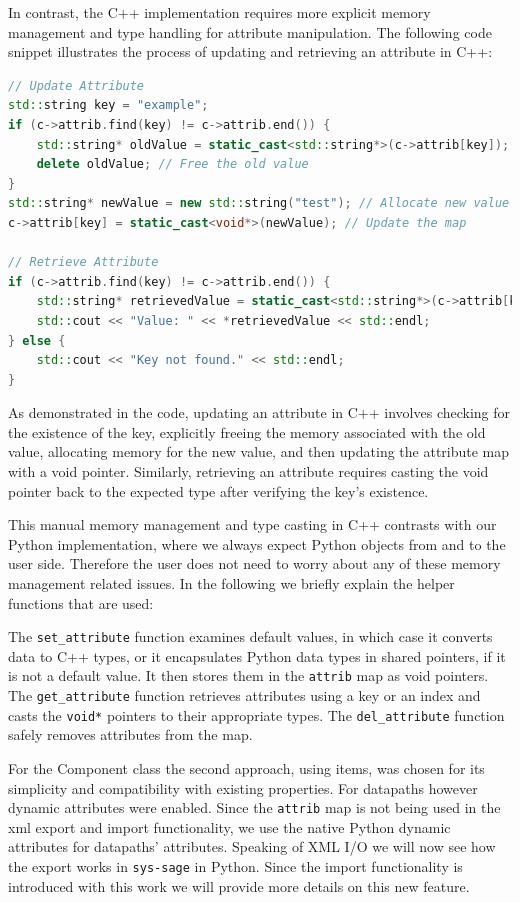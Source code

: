 In contrast, the C++ implementation requires more explicit memory management and type handling for attribute manipulation. The following code snippet illustrates the process of updating and retrieving an attribute in C++:

\begin{lstlisting}[language=C++, xleftmargin=4em, frame = single]
// Update Attribute
std::string key = "example";
if (c->attrib.find(key) != c->attrib.end()) {
    std::string* oldValue = static_cast<std::string*>(c->attrib[key]);
    delete oldValue; // Free the old value
}
std::string* newValue = new std::string("test"); // Allocate new value
c->attrib[key] = static_cast<void*>(newValue); // Update the map

// Retrieve Attribute
if (c->attrib.find(key) != c->attrib.end()) {
    std::string* retrievedValue = static_cast<std::string*>(c->attrib[key]);
    std::cout << "Value: " << *retrievedValue << std::endl;
} else {
    std::cout << "Key not found." << std::endl;
}
\end{lstlisting}

As demonstrated in the code, updating an attribute in C++ involves checking for the existence of the key, explicitly freeing the memory associated with the old value, allocating memory for the new value, and then updating the attribute map with a void pointer. Similarly, retrieving an attribute requires casting the void pointer back to the expected type after verifying the key's existence.\cite{sys-sage-docu} 

This manual memory management and type casting in C++ contrasts with our Python implementation, where we always expect Python objects from and to the user side. Therefore the user does not need to worry about any of these memory management related issues.
In the following we briefly explain the helper functions that are used:

The \verb|set_attribute| function examines default values, in which case it converts data to C++ types, or it encapsulates Python data types in shared pointers, if it is not a default value. It then stores them in the \verb|attrib| map as void pointers. The \verb|get_attribute| function retrieves attributes using a key or an index and casts the \verb|void*| pointers to their appropriate types. The \verb|del_attribute| function safely removes attributes from the map.

For the Component class the second approach, using items, was chosen for its simplicity and compatibility with existing properties. For datapaths however dynamic attributes were enabled. Since the \verb|attrib| map is not being used in the xml export and import functionality, we use the native Python dynamic attributes for datapaths' attributes. 
Speaking of XML I/O we will now see how the export works in \verb|sys-sage| in Python. Since the import functionality is introduced with this work we will provide more details on this new feature. 

